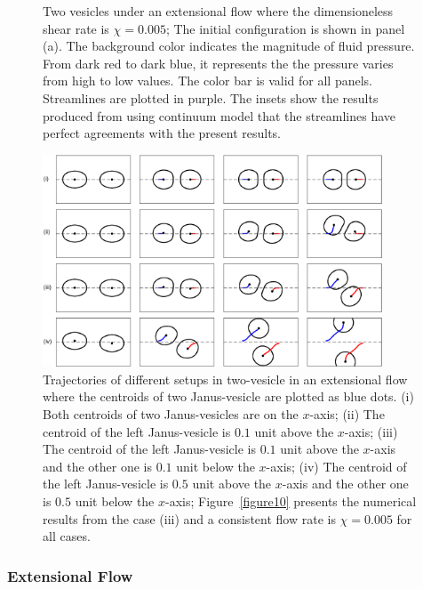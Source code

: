 \documentclass[lineno]{jfm}
\begin{document}
\begin{figure}
  \caption{Two vesicles under an extensional flow where the dimensioneless shear rate is $\chi=0.005$; The initial configuration is shown in panel (a). The background color indicates the magnitude of fluid pressure. From dark red to dark blue, it represents the the pressure varies from high to low values. The color bar is valid for all panels. Streamlines are plotted in purple. The insets show the results produced from using continuum model that the streamlines have perfect agreements with the present results.
  }
    \label{figure11}
\end{figure}


\begin{figure}
\begin{center}
\includegraphics[width=0.9\textwidth]{ExtTraj.eps}
\end{center} 
  \caption{Trajectories of different setups in two-vesicle in an extensional flow where the centroids of two Janus-vesicle are plotted as blue dots. (i) Both centroids of two Janus-vesicles are on the $x$-axis; (ii) The centroid of the left Janus-vesicle is $0.1$ unit above the $x$-axis; (iii) 
  The centroid of the left Janus-vesicle is $0.1$ unit above the $x$-axis and the other one is $0.1$ unit below the $x$-axis; (iv) The centroid of the left Janus-vesicle is $0.5$ unit above the $x$-axis and the other one is $0.5$ unit below the $x$-axis; Figure~\ref{figure10} presents the numerical results from the case (iii) and a 
  consistent flow rate is $\chi = 0.005$ for all cases.}
    \label{figure12}
\end{figure}




\subsubsection{Extensional Flow}
\end{document}
